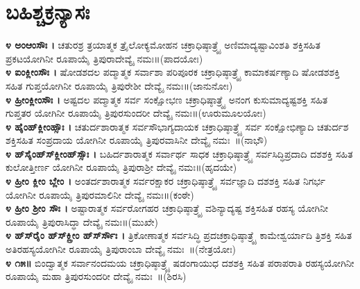 \section{ಬಹಿಶ್ಚಕ್ರನ್ಯಾಸಃ}
{\bfseries ೪ ಅಂಆಂಸೌಃ ।} ಚತುರಶ್ರ ತ್ರಯಾತ್ಮಕ ತ್ರೈಲೋಕ್ಯಮೋಹನ ಚಕ್ರಾಧಿಷ್ಠಾತ್ರ್ಯೈ ಅಣಿಮಾದ್ಯಷ್ಟಾವಿಂಶತಿ ಶಕ್ತಿಸಹಿತ ಪ್ರಕಟಯೋಗಿನೀ ರೂಪಾಯೈ  ತ್ರಿಪುರಾದೇವ್ಯೈ ನಮಃ॥(ಪಾದಯೋಃ)\\
{\bfseries ೪ ಐಂಕ್ಲೀಂಸೌಃ ।} ಷೋಡಶದಲ ಪದ್ಮಾತ್ಮಕ ಸರ್ವಾಶಾ ಪರಿಪೂರಕ ಚಕ್ರಾಧಿಷ್ಠಾತ್ರ್ಯೈ ಕಾಮಾಕರ್ಷಣ್ಯಾದಿ ಷೋಡಶಶಕ್ತಿ ಸಹಿತ ಗುಪ್ತಯೋಗಿನೀ ರೂಪಾಯೈ ತ್ರಿಪುರೇಶೀ ದೇವ್ಯೈ ನಮಃ॥(ಜಾನುನೋಃ)\\
{\bfseries ೪ ಹ್ರೀಂಕ್ಲೀಂಸೌಃ ।} ಅಷ್ಟದಲ ಪದ್ಮಾತ್ಮಕ ಸರ್ವ ಸಂಕ್ಷೋಭಣ ಚಕ್ರಾಧಿಷ್ಠಾತ್ರ್ಯೈ ಅನಂಗ ಕುಸುಮಾದ್ಯಷ್ಟಶಕ್ತಿ ಸಹಿತ ಗುಪ್ತತರ ಯೋಗಿನೀ ರೂಪಾಯೈ ತ್ರಿಪುರಸುಂದರೀ ದೇವ್ಯೈ ನಮಃ॥(ಊರುಮೂಲಯೋಃ)\\
{\bfseries ೪ ಹೈಂಹ್‌ಕ್ಲೀಂಹ್ಸೌಃ ।} ಚತುರ್ದಶಾರಾತ್ಮಕ ಸರ್ವಸೌಭಾಗ್ಯದಾಯಕ ಚಕ್ರಾಧಿಷ್ಠಾತ್ರ್ಯೈ ಸರ್ವ ಸಂಕ್ಷೋಭಿಣ್ಯಾದಿ ಚತುರ್ದಶ ಶಕ್ತಿಸಹಿತ ಸಂಪ್ರದಾಯ ಯೋಗಿನೀ ರೂಪಾಯೈ  ತ್ರಿಪುರವಾಸಿನೀ ದೇವ್ಯೈ ನಮಃ~॥(ನಾಭೌ)\\
{\bfseries ೪ ಹ್‌ಸೈಂಹ್‌ಸ್‌ಕ್ಲೀಂಹ್‌ಸ್ಸೌಃ ।} ಬಹಿರ್ದಶಾರಾತ್ಮಕ ಸರ್ವಾರ್ಥ ಸಾಧಕ ಚಕ್ರಾಧಿಷ್ಠಾತ್ರ್ಯೈ ಸರ್ವಸಿದ್ಧಿಪ್ರದಾದಿ ದಶಶಕ್ತಿ ಸಹಿತ ಕುಲೋತ್ತೀರ್ಣ ಯೋಗಿನೀ ರೂಪಾಯೈ  ತ್ರಿಪುರಾಶ್ರೀ ದೇವ್ಯೈ ನಮಃ॥(ಹೃದಯೇ)\\
{\bfseries ೪ ಹ್ರೀಂ ಕ್ಲೀಂ ಬ್ಲೇಂ ।} ಅಂತರ್ದಶಾರಾತ್ಮಕ ಸರ್ವರಕ್ಷಾಕರ ಚಕ್ರಾಧಿಷ್ಠಾತ್ರ್ಯೈ ಸರ್ವಜ್ಞಾದಿ ದಶಶಕ್ತಿ ಸಹಿತ ನಿಗರ್ಭ ಯೋಗಿನೀ ರೂಪಾಯೈ  ತ್ರಿಪುರಮಾಲಿನೀ ದೇವ್ಯೈ ನಮಃ॥(ಕಂಠೇ)\\
{\bfseries ೪ ಹ್ರೀಂ ಶ್ರೀಂ ಸೌಃ ।} ಅಷ್ಟಾರಾತ್ಮಕ ಸರ್ವರೋಗಹರ ಚಕ್ರಾಧಿಷ್ಠಾತ್ರ್ಯೈ ವಶಿನ್ಯಾದ್ಯಷ್ಟ ಶಕ್ತಿಸಹಿತ ರಹಸ್ಯ ಯೋಗಿನೀ ರೂಪಾಯೈ  ತ್ರಿಪುರಾಸಿದ್ಧಾ ದೇವ್ಯೈ ನಮಃ॥(ಮುಖೇ)\\
{\bfseries ೪ ಹ್‌ಸ್‌ರೈಂ ಹ್‌ಸ್‌ಕ್ಲ್ರೀಂ ಹ್‌ಸ್‌ರ್ಸೌಃ ।} ತ್ರಿಕೋಣಾತ್ಮಕ ಸರ್ವಸಿದ್ಧಿ ಪ್ರದಚಕ್ರಾಧಿಷ್ಠಾತ್ರ್ಯೈ ಕಾಮೇಶ್ವರ್ಯಾದಿ ತ್ರಿಶಕ್ತಿ ಸಹಿತ ಅತಿರಹಸ್ಯಯೋಗಿನೀ ರೂಪಾಯೈ  ತ್ರಿಪುರಾಂಬಾ ದೇವ್ಯೈ ನಮಃ~॥(ನೇತ್ರಯೋಃ)\\
{\bfseries ೪ ೧೫॥} ಬಿಂದ್ವಾತ್ಮಕ ಸರ್ವಾನಂದಮಯ ಚಕ್ರಾಧಿಷ್ಠಾತ್ರ್ಯೈ ಷಡಂಗಾಯುಧ ದಶಶಕ್ತಿ ಸಹಿತ ಪರಾಪರಾತಿ ರಹಸ್ಯಯೋಗಿನೀ ರೂಪಾಯೈ ಮಹಾ ತ್ರಿಪುರಸುಂದರೀ ದೇವ್ಯೈ ನಮಃ~॥(ಶಿರಸಿ)
